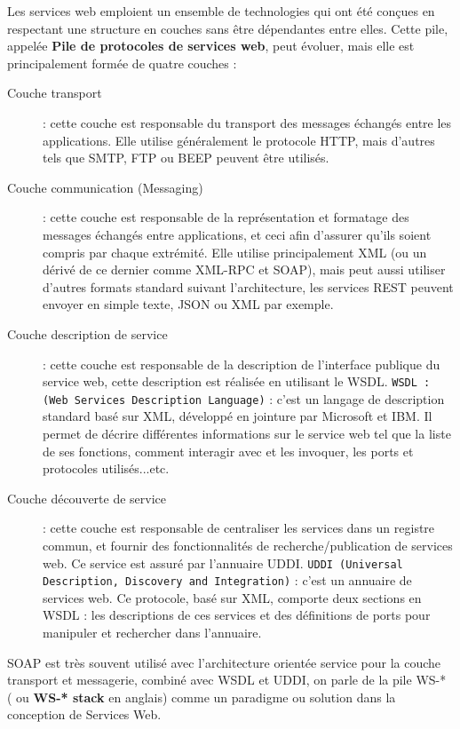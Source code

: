 Les services web emploient un ensemble de technologies qui ont été conçues en respectant une structure en couches sans être dépendantes entre elles. Cette pile, appelée \textbf{Pile de protocoles de services web}, peut évoluer, mais elle est principalement formée de quatre couches : \cite{refTutorialPointsWS}
\begin{description}
	\item[Couche transport] : cette couche est responsable du transport des messages échangés entre les applications. Elle utilise généralement le protocole HTTP, mais d'autres tels que SMTP, FTP ou BEEP peuvent être utilisés.
	\item [Couche communication (Messaging)] : cette couche est responsable de la représentation et formatage des messages échangés entre applications, et ceci afin d'assurer qu'ils soient compris par chaque extrémité. Elle utilise principalement XML (ou un dérivé de ce dernier comme XML-RPC et SOAP), mais peut aussi utiliser d'autres formats standard suivant l'architecture, les services REST peuvent envoyer en simple texte, JSON ou XML par exemple.
	\item[Couche description de service] : cette couche est responsable de la description de l'interface publique du service web, cette description est réalisée en utilisant le WSDL.\newline
	      \texttt{WSDL : (Web Services Description Language)} : c'est un langage de description standard basé sur XML, développé en jointure par Microsoft et IBM. Il permet de décrire différentes informations sur le service web tel que la liste de ses fonctions, comment interagir avec et les invoquer, les ports et protocoles utilisés...etc.
	\item[Couche découverte de service] : cette couche est responsable de centraliser les services dans un registre commun, et fournir des fonctionnalités de recherche/publication de services web. Ce service est assuré par l'annuaire UDDI.\newline
	      \texttt{UDDI (Universal Description, Discovery and Integration)} : c'est un annuaire de services web. Ce protocole, basé sur XML, comporte deux sections en WSDL : les descriptions de ces services et des définitions de ports pour manipuler et rechercher dans l'annuaire.
\end{description}

SOAP est très souvent utilisé avec l'architecture orientée service pour la couche transport et messagerie, combiné avec WSDL et UDDI, on parle de la pile WS-* ( ou \textbf{WS-* stack} en anglais) comme un paradigme ou solution dans la conception de Services Web.

